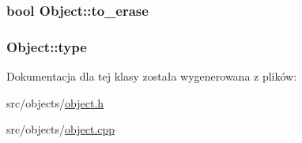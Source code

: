 \subsubsection[{to\+\_\+erase}]{\setlength{\rightskip}{0pt plus 5cm}bool Object\+::to\+\_\+erase}\label{class_object_a77c2ada7189758c530ab24a7b366d3fb}
\hypertarget{class_object_a1b89f32cd9e0040f8a2455f3cef7d0d2}{}
\subsubsection[{type}]{ Object\+::type}\label{class_object_a1b89f32cd9e0040f8a2455f3cef7d0d2}


Dokumentacja dla tej klasy została wygenerowana z plików\+:\begin{DoxyCompactItemize}
\item 
src/objects/\hyperlink{object_8h}{object.\+h}\item 
src/objects/\hyperlink{object_8cpp}{object.\+cpp}\end{DoxyCompactItemize}
